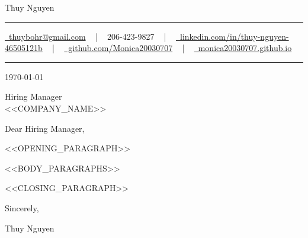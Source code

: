 \documentclass[letterpaper,11pt]{article}
\begin{document}
\begin{center}
    {\Huge\color{accentTitle} Thuy Nguyen}\\[5pt]
    {\color{accentLine}\hrule}
    \vspace{4pt}
    \footnotesize{
        \href{mailto:thuybohr@gmail.com}{\faEnvelope\ thuybohr@gmail.com} ~ | ~
        206-423-9827 ~ | ~
        \href{https://linkedin.com/in/thuy-nguyen-46505121b}{\faLinkedin\ linkedin.com/in/thuy-nguyen-46505121b} ~ | ~
        \href{https://github.com/Monica20030707}{\faGithub\ github.com/Monica20030707} ~ | ~
        \href{https://monica20030707.github.io/}{\faGlobe\ monica20030707.github.io}
    }
    \vspace{2pt}
    {\color{accentLine}\hrule}
\end{center}

\vspace{20pt}

\today

\vspace{10pt}

Hiring Manager\\
<<COMPANY_NAME>>

\vspace{10pt}

Dear Hiring Manager,

\vspace{10pt}

<<OPENING_PARAGRAPH>>

<<BODY_PARAGRAPHS>>

<<CLOSING_PARAGRAPH>>

\vspace{20pt}

Sincerely,

\vspace{10pt}

Thuy Nguyen
\end{document}
